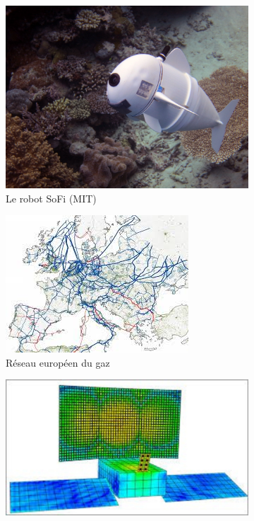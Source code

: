 \documentclass[french]{article}
\begin{document}
\begin{figure}
	\begin{subfigure}[t]{0.25\textwidth}
		\includegraphics[width=\columnwidth]{Sofi_MIT.jpeg}%
		\caption{Le robot SoFi (MIT)}
		\label{fig:sofi-mit}
	\end{subfigure}\hfill
	\begin{subfigure}[t]{0.25\textwidth}
		\includegraphics[width=\columnwidth]{EU_gas_network.jpeg}%
		\caption{Réseau européen du gaz}
		\label{fig:network}
	\end{subfigure}\hfill
	\begin{subfigure}[t]{0.35\textwidth}
		\includegraphics[width=\columnwidth]{Reflectarray.jpg} 

\end{subfigure}
\end{figure}
\end{document}
